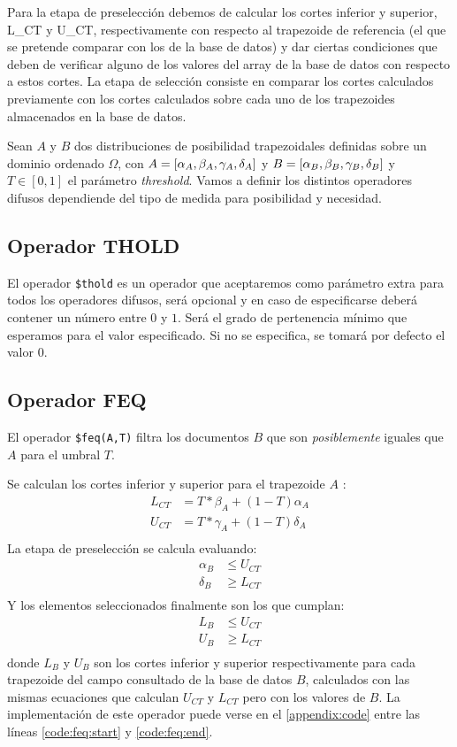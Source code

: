 Para la etapa de preselección debemos de calcular los cortes inferior y superior, L\_CT y U\_CT, respectivamente con respecto al trapezoide de referencia (el que se pretende comparar con los de la base de datos) y dar ciertas condiciones que deben de verificar alguno de los valores del array de la base de datos con respecto a estos cortes. La etapa de selección consiste en comparar los cortes calculados previamente con los cortes calculados sobre cada uno de los trapezoides almacenados en la base de datos. 

Sean $A$ y $B$ dos distribuciones de posibilidad trapezoidales definidas sobre un dominio ordenado $\Omega$, con $A = [\alpha_A, \beta_A, \gamma_A, \delta_A]$ y $B=[\alpha_B, \beta_B, \gamma_B, \delta_B]$ y $T \in [0,1]$ el parámetro \textit{threshold}. Vamos a definir los distintos operadores difusos dependiende del tipo de medida para posibilidad y necesidad.

\subsection{Operador THOLD}

El operador \texttt{\$thold} es un operador que aceptaremos como parámetro extra para todos los operadores difusos, será opcional y en caso de especificarse deberá contener un número entre $0$ y $1$. Será el grado de pertenencia mínimo que esperamos para el valor especificado. Si no se especifica, se tomará por defecto el valor $0$.

\subsection{Operador FEQ}

El operador \texttt{\$feq(A,T)} filtra los documentos $B$ que son \textit{posiblemente} iguales que $A$ para el umbral $T$.

Se calculan los cortes inferior y superior para el trapezoide $A$ \cite{indexingstrategies}:
%
\begin{align*}
    L_{CT} &= T * \beta_A + (1-T)\alpha_A \\
    U_{CT} &= T * \gamma_A + (1-T)\delta_A \\
\end{align*}
%
La etapa de preselección se calcula evaluando:
%
\begin{align*}
    \alpha_B &\leq U_{CT} \\
    \delta_B &\geq L_{CT} \\
\end{align*}
%
Y los elementos seleccionados finalmente son los que cumplan:
%
\begin{align*}
    L_B &\leq U_{CT} \\
    U_B &\geq L_{CT} \\
\end{align*}
%
donde $L_B$ y $U_B$ son los cortes inferior y superior respectivamente para cada trapezoide del campo consultado de la base de datos $B$, calculados con las mismas ecuaciones que calculan $U_{CT}$ y $L_{CT}$ pero con los valores de $B$.
La implementación de este operador puede verse en el \autoref{appendix:code} entre las líneas \ref{code:feq:start} y \ref{code:feq:end}.

